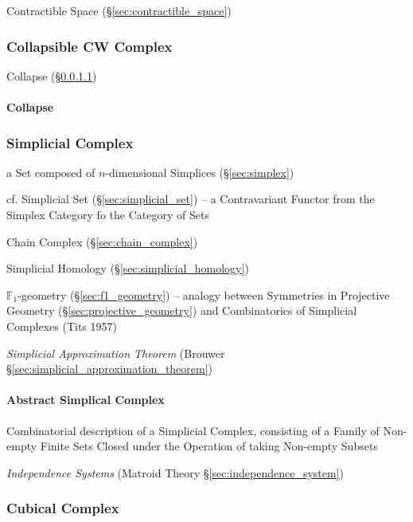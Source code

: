 Contractible Space (\S\ref{sec:contractible_space})



\subsubsection{Collapsible CW Complex}
\label{sec:collapsible_cwcomplex}

Collapse (\S\ref{sec:collapse})



\paragraph{Collapse}\label{sec:collapse}\hfill



\subsubsection{Simplicial Complex}\label{sec:simplicial_complex}

a Set composed of $n$-dimensional Simplices (\S\ref{sec:simplex})

\fist cf. Simplicial Set (\S\ref{sec:simplicial_set}) -- a Contravariant Functor
from the Simplex Category fo the Category of Sets

Chain Complex (\S\ref{sec:chain_complex})

Simplicial Homology (\S\ref{sec:simplicial_homology})

$\mathbb{F}_1$-geometry (\S\ref{sec:f1_geometry}) -- analogy between Symmetries
in Projective Geometry (\S\ref{sec:projective_geometry}) and Combinatorics of
Simplicial Complexes (Tits 1957)

\emph{Simplicial Approximation Theorem} (Brouwer
\S\ref{sec:simplicial_approximation_theorem})



\paragraph{Abstract Simplical Complex}\label{sec:abstract_complex}\hfill

Combinatorial description of a Simplicial Complex, consisting of a Family of
Non-empty Finite Sets Closed under the Operation of taking Non-empty Subsets

\fist \emph{Independence Systems} (Matroid Theory
\S\ref{sec:independence_system})



\subsubsection{Cubical Complex}\label{sec:cubical_complex}



